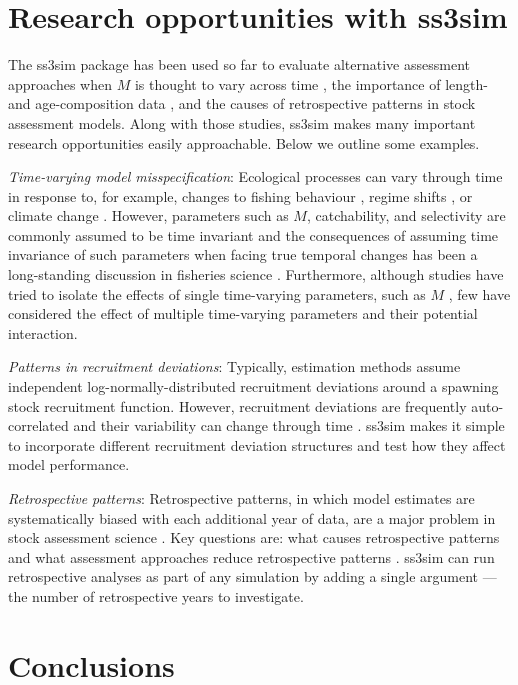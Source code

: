 \documentclass[10pt]{article}
\begin{document}
\section*{Research opportunities with ss3sim}

The ss3sim package has been used so far to evaluate alternative assessment approaches when $M$ is thought to vary across time \cite{johnson2013}, the importance of length- and age-composition data \cite{ono2013}, and the causes of retrospective patterns in stock assessment models. Along with those studies, ss3sim makes many important research opportunities easily approachable. Below we outline some examples.

\emph{Time-varying model misspecification}: Ecological processes can vary through time in response to, for example, changes to fishing behaviour \cite{hilborn1992}, regime shifts \cite{vert-pre2013}, or climate change \cite{walther2002}. However, parameters such as $M$, catchability, and selectivity are commonly assumed to be time invariant and the consequences of assuming time invariance of such parameters when facing true temporal changes has been a long-standing discussion in fisheries science \cite{royama1992, wilberg2006, fu2001}. Furthermore, although studies have tried to isolate the effects of single time-varying parameters, such as $M$ \cite{lee2011, jiao2012, deroba2013, johnson2013}, few have considered the effect of multiple time-varying parameters and their potential interaction.

\emph{Patterns in recruitment deviations}: Typically, estimation methods assume independent log-normally-distributed recruitment deviations around a spawning stock recruitment function. However, recruitment deviations are frequently auto-correlated and their variability can change through time \cite{beamish1995, pyper1998}. ss3sim makes it simple to incorporate different recruitment deviation structures and test how they affect model performance.

\emph{Retrospective patterns}: Retrospective patterns, in which model estimates are systematically biased with each additional year of data, are a major problem in stock assessment science \cite{mohn1999, legault2008}. Key questions are: what causes retrospective patterns and what assessment approaches reduce retrospective patterns \cite{legault2008}. ss3sim can run retrospective analyses as part of any simulation by adding a single argument --- the number of retrospective years to investigate.

\section*{Conclusions}
\end{document}
